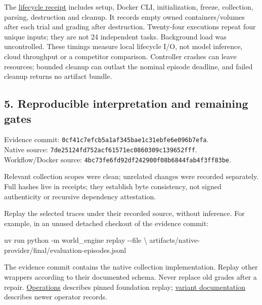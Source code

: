 \documentclass[
  11pt,
  letterpaper,
]{article}
\newenvironment{Shaded}{}{}
\newcommand{\AttributeTok}[1]{\textcolor[rgb]{0.49,0.56,0.16}{#1}}
\newcommand{\DataTypeTok}[1]{\textcolor[rgb]{0.56,0.13,0.00}{#1}}
\newcommand{\ExtensionTok}[1]{#1}
\newcommand{\NormalTok}[1]{#1}
\begin{document}
The
\href{../../artifacts/docker-executor/final/lifecycle.json}{lifecycle
receipt} includes setup, Docker CLI, initialization, freeze, collection,
parsing, destruction and cleanup. It records empty owned
containers/volumes after each trial and grading after destruction.
Twenty-four executions repeat four unique inputs; they are not 24
independent tasks. Background load was uncontrolled. These timings
measure local lifecycle I/O, not model inference, cloud throughput or a
competitor comparison. Controller crashes can leave resources; bounded
cleanup can outlast the nominal episode deadline, and failed cleanup
returns no artifact bundle.

\newpage

\subsection{5. Reproducible interpretation and remaining
gates}\label{reproducible-interpretation-and-remaining-gates}

Evidence commit: \texttt{0cf41c7efcb5a1af345bae1c31ebfe6e096b7efa}.\\
Native source: \texttt{7de25124fd752acf61571ec0860309c139652fff}.\\
Workflow/Docker source:
\texttt{4bc73fe6fd92df242900f08b6844fab4f3ff83be}.

Relevant collection scopes were clean; unrelated changes were recorded
separately. Full hashes live in receipts; they establish byte
consistency, not signed authenticity or recursive dependency
attestation.

Replay the selected traces under their recorded source, without
inference. For example, in an unused detached checkout of the evidence
commit:

\begin{Shaded}
\begin{Highlighting}[]
\ExtensionTok{uv}\NormalTok{ run python }\AttributeTok{{-}m}\NormalTok{ world\_engine replay }\AttributeTok{{-}{-}file} \DataTypeTok{\textbackslash{}}
\NormalTok{  artifacts/native{-}provider/final/evaluation{-}episodes.jsonl}
\end{Highlighting}
\end{Shaded}

The evidence commit contains the native collection implementation.
Replay other wrappers according to their documented schema. Never
replace old grades after a repair. \href{../OPERATIONS.md}{Operations}
describes pinned foundation replay;
\href{../workflow-variants.md}{variant documentation} describes newer
operator records.
\end{document}
